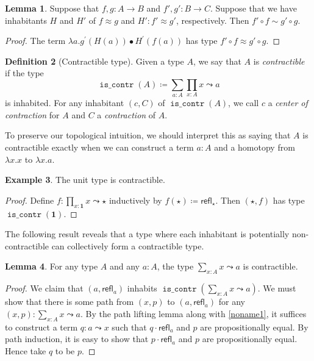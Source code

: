 \documentclass[10pt,letterpaper,cm]{nupset}
\theoremstyle{definition}
\newtheorem{definition}{Definition}[subsection]
\newtheorem{exmp}[definition]{Example}
\theoremstyle{theorem}
\newtheorem{lemma}[definition]{Lemma}
\theoremstyle{remark}
\newcommand{\refl}{\mathsf{refl}}
\newcommand{\0}{\mathbf{0}}
\newcommand{\1}{\mathbf{1}}
\newcommand{\2}{\mathbf{2}}
\DeclareMathOperator{\iscont}{\mathtt{is\_contr}}
\begin{document}
\begin{lemma}\label{htpy-comp}
Suppose that $f,g: A\to B$ and $f',g' : B \to C$. Suppose that we have inhabitants $H$ and $H'$ of $f \approx g$ and $H' : f' \approx g'$, respectively. Then $f' \circ f \sim g' \circ g$.  
\end{lemma}
\begin{proof}
The term $\lambda a .g^{\prime}(H(a)) \bullet H^{\prime}(f(a))$ has type $f' \circ f \approx g' \circ g$.
\end{proof}

\smallskip

\begin{definition}[Contractible type]
Given a type $A$, we say that $A$ is \textit{contractible} if  the type
\[
\iscont(A)\coloneqq \sum_{a:A}\prod_{x:A}x \leadsto a
\] is inhabited.  For any inhabitant $\left(c, C\right)$ of $\iscont(A)$, we call $c$ a \textit{center of contraction} for $A$ and $C$ a \textit{contraction} of $A$.
\end{definition}

To preserve our topological intuition, we should interpret this as saying that $A$ is contractible exactly when we can construct a term $a:A$ and a homotopy from $\lambda x.x$ to $\lambda x.a$.


\begin{exmp} 
 The unit type is contractible.
\end{exmp}
\begin{proof}
Define $f: \prod_{x: \1} x \leadsto \star$ inductively by $f(\star) \coloneqq \refl_{\star}$. Then  $\left(\star, f\right)$ has type $\iscont(\1)$. 
\end{proof}



The following result reveals that a type where each inhabitant is potentially non-contractible can collectively form a contractible type.

\begin{lemma}\label{total-cont}
For any type $A$ and any $a:A$, the type $\sum_{x:A}x \leadsto a$ is contractible.
\end{lemma}
\begin{proof}
 We claim that $\left(a, \refl_a\right)$ inhabits $\iscont(\sum_{x:A}x \leadsto a)$. We must show that there is some  path from $\left(x,p\right)$ to $\left(a, \refl_a\right)$ for any $\left(x,p\right) : \sum_{x:A}x \leadsto a$. By the path lifting lemma along with \cref{noname1}, it suffices to construct a term $q: a \leadsto x$ such that $q\cdot \refl_a$ and $p$ are propositionally equal. By path induction, it is easy to show that $p \cdot \refl_a$ and $p$ are propositionally equal. Hence take $q$ to be $p$.
\end{proof}
\end{document}
